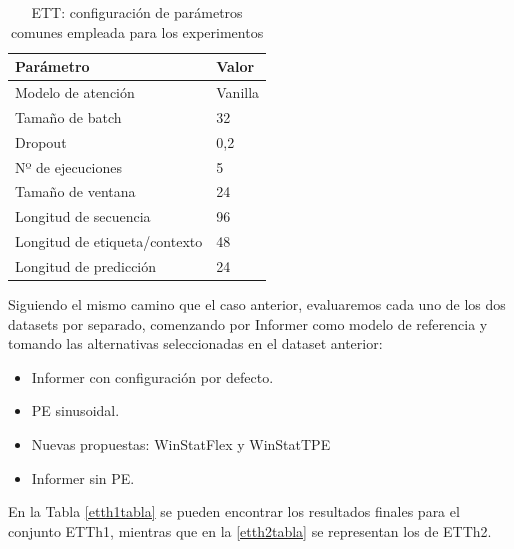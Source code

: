 \begin{table}[!ht]
	\centering
	\begin{tabular}{l|l}
		\toprule
		Parámetro & Valor \\
		\midrule
		{Modelo de atención} & Vanilla \\
		{Tamaño de batch} & 32 \\
		{Dropout} & 0,2 \\
		{Nº de ejecuciones} & 5 \\
		{Tamaño de ventana} & 24 \\
		{Longitud de secuencia} & 96 \\
		{Longitud de etiqueta/contexto} & 48 \\
		{Longitud de predicción} & 24 \\
		\bottomrule
	\end{tabular}
	\caption{ETT: configuración de parámetros comunes empleada para los experimentos}
	\label{ajustesett}
\end{table}

Siguiendo el mismo camino que el caso anterior, evaluaremos cada uno de los dos datasets por separado, comenzando por Informer como modelo de referencia y tomando las alternativas seleccionadas en el dataset anterior:

\begin{itemize}
	\item Informer con configuración por defecto.
	\item PE sinusoidal.
	\item Nuevas propuestas: WinStatFlex y WinStatTPE
	\item Informer sin PE.
\end{itemize}

En la Tabla \ref{etth1tabla} se pueden encontrar los resultados finales para el conjunto ETTh1, mientras que en la \ref{etth2tabla} se representan los de ETTh2.

